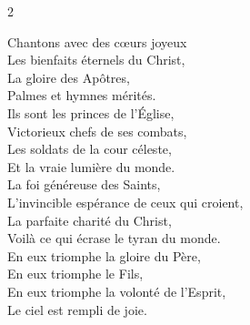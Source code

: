 \documentclass[11pt, twoside, french, openany]{book}
\begin{document}

\thispagestyle{empty}

	{}{}{2}{}
	{}{}{}
	{}
	{}




\begin{multicols}{2}
Chantons avec des cœurs joyeux\\
Les bienfaits éternels du Christ,\\
La gloire des Apôtres,\\
Palmes et hymnes mérités.\\

Ils sont les princes de l’Église,\\
Victorieux chefs de ses combats,\\
Les soldats de la cour céleste,\\
Et la vraie lumière du monde.\\

La foi généreuse des Saints,\\
L’invincible espérance de ceux qui croient,\\
La parfaite charité du Christ,\\
Voilà ce qui écrase le tyran du monde.\\

En eux triomphe la gloire du Père,\\
En eux triomphe le Fils,\\
En eux triomphe la volonté de l’Esprit,\\
Le ciel est rempli de joie.
\end{multicols}
\end{document}
